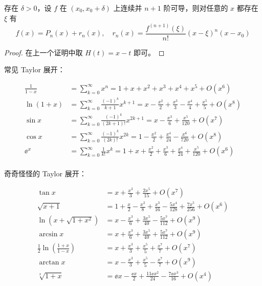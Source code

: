 \begin{theorem}
	存在 $\delta > 0$，设 $f$ 在 $(x_0, x_0+\delta)$ 上连续并 $n + 1$ 阶可导，则对任意的 $x$ 都存在 $\xi$ 有
	\[ f(x) = P_n(x) + r_n(x), \quad r_n(x) = \frac{f^{(n+1)}(\xi)}{n!}(x-\xi)^n(x-x_0) \]
\end{theorem}

\begin{proof}
	在上一个证明中取 $H(t) = x - t$ 即可。
\end{proof}

常见 Taylor 展开：

\[
	\begin{aligned}
		\frac{1}{1-x} & = \sum_{k=0}^\infty x^n                             = 1 + x + x^2 + x^3  + x^4 + x^5 + O(x^6)                                             \\
		\ln(1+x)      & = \sum_{k=0}^\infty\frac{(-1)^k}{k+1}x^{k+1}        = x - \frac{x^2}{2} + \frac{x^3}{3} - \frac{x^4}{4} + \frac{x^5}{5} + O(x^8)          \\
		\sin x        & = \sum_{k=0}^\infty \frac{(-1)^k}{(2k+1)!}x^{2k+1}  = x - \frac{x^3}{6} + \frac{x^5}{120} + O(x^{7})                                      \\
		\cos x        & = \sum_{k=0}^\infty \frac{(-1)^k}{(2k)!}x^{2k}      = 1 - \frac{x^2}{2} + \frac{x^4}{24} - \frac{x^6}{720} +  O(x^{8})                    \\
		\ee^x         & = \sum_{k=0}^\infty\frac{1}{k!}x^k                  = 1 + x + \frac{x^2}{2} + \frac{x^3}{6} + \frac{x^4}{24} + \frac{x^5}{120} + O(x^{6}) \\
	\end{aligned}
\]

奇奇怪怪的 Taylor 展开：

\[
	\begin{aligned}
		\tan x                                     & = x + \frac{x^3}{3} + \frac{2x^5}{15} +  O(x^{7})                                                \\
		\sqrt{x+1}                                 & = 1 + \frac{x}{2}-\frac{x^2}{8} +\frac{x^3}{16}-\frac{5 x^4}{128} +\frac{7 x^5}{256} +  O(x^{6}) \\
		\ln(x + \sqrt{1+x^2})                      & = x - \frac{x^3}{6} + \frac{3x^5}{40} - \frac{5 x^7}{112} + O(x^{9})                             \\
		\arcsin x                                  & = x + \frac{x^3}{6} + \frac{3x^5}{40} + \frac{5 x^7}{112}+ O(x^{9})                              \\
		\frac{1}{2}\ln\left(\frac{1+x}{1-x}\right) & = x + \frac{x^3}{3} + \frac{x^5}{5} + \frac{x^7}{7}  + O(x^{7})                                  \\
		\arctan x                                  & = x - \frac{x^3}{3} + \frac{x^5}{5} - \frac{x^7}{7}  + O(x^{9})                                  \\
		\sqrt[x]{1+x}                              & = \ee x - \frac{\ee x}{2} + \frac{11 \ee x^2}{24} - \frac{7 \ee x^3}{16} + O(x^{4})
	\end{aligned}
\]

